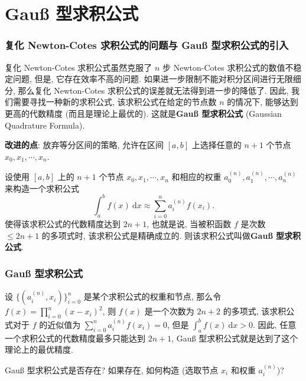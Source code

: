
\section{Gauß 型求积公式}


\begin{frame}
\frametitle{复化 Newton-Cotes 求积公式的问题与 Gauß 型求积公式的引入}

复化 Newton-Cotes 求积公式虽然克服了 $n$ 步 Newton-Cotes 求积公式的数值不稳定问题, 但是, 它存在效率不高的问题. 如果进一步限制不能对积分区间进行无限细分, 那么复化 Newton-Cotes 求积公式的误差就无法得到进一步的降低了. 因此, 我们需要寻找一种新的求积公式, 该求积公式在给定的节点数 $n$ 的情况下, 能够达到更高的代数精度 (而且是\alert{理论上最优的}). 这就是\textbf{Gauß 型求积公式} (Gaussian Quadrature Formula).

\pause
\vspace{0.5em}

\textbf{改进的点}: 放弃等分区间的策略, 允许在区间 $[a, b]$ 上选择任意的 $n+1$ 个节点 $x_0, x_1, \cdots, x_n.$

\pause

\begin{Def}
设使用 $[a, b]$ 上的 $n+1$ 个节点 $x_0, x_1, \cdots, x_n$ 和相应的权重 $a_0^{(n)}, a_1^{(n)}, \cdots, a_n^{(n)}$ 来构造一个求积公式
\[
\int_a^b f(x) ~ \mathrm{d}x \approx \sum_{i=0}^n a_i^{(n)} f(x_i).
\]
使得该求积公式的代数精度达到 $2n+1$, 也就是说, 当被积函数 $f$ 是次数 $\leqslant 2n+1$ 的多项式时, 该求积公式是精确成立的. 则该求积公式叫做\textbf{Gauß 型求积公式}.
\end{Def}

\end{frame}


\begin{frame}
\frametitle{Gauß 型求积公式}

\begin{remark}
设 $\{(a_i^{(n)}, x_i)\}_{i=0}^n$ 是某个求积公式的权重和节点, 那么令 $f(x) = \prod_{i=0}^n (x - x_i)^2$, 则 $f(x)$ 是一个次数为 $2n+2$ 的多项式, 该求积公式对于 $f$ 的近似值为 $\sum_{i=0}^n a_i^{(n)} f(x_i) = 0$, 但是 $\int_a^b f(x) ~ \mathrm{d}x > 0$. 因此, 任意一个求积公式的代数精度最多只能达到 $2n+1$, Gauß 型求积公式就是达到了这个理论上的最优精度.
\end{remark}

\pause
\vspace{1cm}

\begin{question}
Gauß 型求积公式是否存在? 如果存在, 如何构造 (选取节点 $x_i$ 和权重 $a_i^{(n)}$)?
\end{question}

\end{frame}

